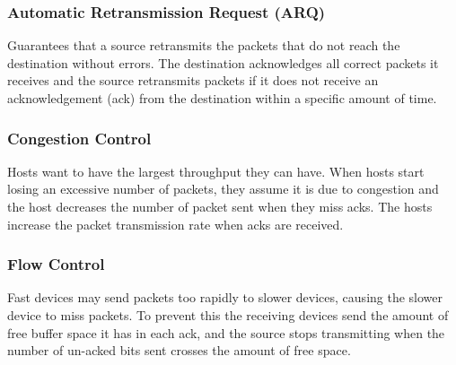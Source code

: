 \subsubsection*{Automatic Retransmission Request (ARQ)}
Guarantees that a source retransmits the packets that do not reach the destination without errors. The destination acknowledges all correct packets it receives and the source retransmits packets if it does not receive an acknowledgement (ack) from the destination within a specific amount of time. 
\subsubsection*{Congestion Control}
Hosts want to have the largest throughput they can have. When hosts start losing an excessive number of packets, they assume it is due to congestion and the host decreases the number of packet sent when they miss acks. The hosts increase the packet transmission rate when acks are received.
\subsubsection*{Flow Control}
Fast devices may send packets too rapidly to slower devices, causing the slower device to miss packets. To prevent this the receiving devices send the amount of free buffer space it has in each ack, and the source stops transmitting when the number of un-acked bits sent crosses the amount of free space. 

